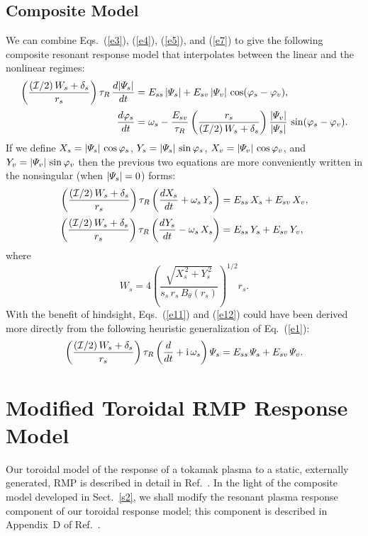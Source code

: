 \documentclass[12pt,prb,aps]{revtex4-1}
\begin{document}
\subsection{Composite Model}
We can combine Eqs.~(\ref{e3}), (\ref{e4}), (\ref{e5}), and (\ref{e7}) to give the following
composite resonant response model that interpolates between the linear and the nonlinear
regimes:
\begin{align}\label{e9}
\left(\frac{({\cal I}/2)\,W_s+\delta_s}{r_s}\right)\tau_R\,\frac{d|{\mit\Psi}_s|}{dt} &= E_{ss}\,|{\mit\Psi}_s| + E_{sv}\,|{\mit\Psi}_v|\,\cos(\varphi_s-\varphi_v),\\[0.5ex]
\frac{d\varphi_s}{dt}& = \omega_s - \frac{E_{sv}}{\tau_R}\left(\frac{r_s}{({\cal I}/2)\,W_s+\delta_s}\right)\frac{|{\mit\Psi}_v|}{|{\mit\Psi}_s|}\,\sin(\varphi_s-\varphi_v).\label{e10}
\end{align}
If we define $X_s = |{\mit\Psi}_s|\,\cos\varphi_s$, $Y_s = |{\mit\Psi}_s|\,\sin\varphi_s$, $X_v = |{\mit\Psi}_v|\,\cos\varphi_v$, and $Y_v = |{\mit\Psi}_v|\,\sin\varphi_v$ 
then the previous two equations are more conveniently written in the nonsingular (when $|{\mit\Psi}_s|=0$) forms:\,\cite{slip1,slip2,slip3}
\begin{align}\label{e11}
\left(\frac{({\cal I}/2)\,W_s+\delta_s}{r_s}\right)\tau_R\left(\frac{dX_s}{dt}+\omega_s\,Y_s\right)&= E_{ss}\,X_s + E_{sv}\,X_v,\\[0.5ex]
\left(\frac{({\cal I}/2)\,W_s+\delta_s}{r_s}\right)\tau_R\left(\frac{dY_s}{dt}-\omega_s\,X_s\right)& = E_{ss}\,Y_s + E_{sv}\,Y_v,\label{e12}
\end{align}
where
\begin{equation}
W_s = 4\left(\frac{\sqrt{X_s^{\,2}+Y_s^{\,2}}}{s_s\,r_s\,B_\theta(r_s)}\right)^{1/2} r_s.
\end{equation}
With the benefit of hindsight, Eqs.~(\ref{e11}) and (\ref{e12}) could have been derived more directly from the
following heuristic generalization of Eq.~(\ref{e1}):\,\cite{slip2}
\begin{equation}
\left(\frac{({\cal I}/2)\,W_s+\delta_s}{r_s}\right)\tau_R\left(\frac{d}{dt}+{\rm i}\,\omega_s\right){\mit\Psi}_s= E_{ss}\,{\mit\Psi}_s+E_{sv}\,{\mit\Psi}_v.
\end{equation}

\section{Modified Toroidal RMP Response Model}
Our toroidal model of the response of a tokamak plasma to a static, externally generated, RMP is described in
detail in Ref.~. In the light of the composite model developed in Sect.~\ref{s2}, we shall
modify the resonant plasma response component of our  toroidal response model; this component is described in Appendix~D of Ref.~.
\end{document}
